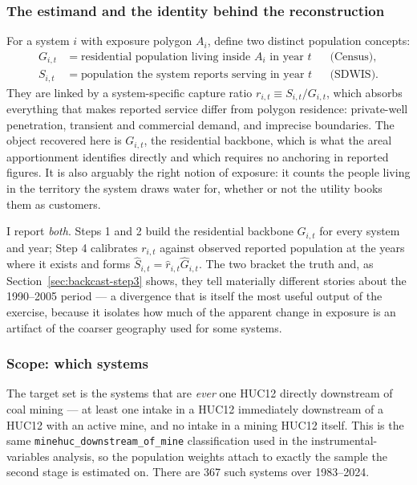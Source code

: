 \subsubsection{The estimand and the identity behind the reconstruction}

For a system $i$ with exposure polygon $A_i$, define two distinct population
concepts:
%
\begin{align}
G_{i,t} &= \text{residential population living inside } A_i \text{ in year } t
  &&\text{(Census)}, \\
S_{i,t} &= \text{population the system reports serving in year } t
  &&\text{(SDWIS)} .
\end{align}
%
They are linked by a system-specific capture ratio $r_{i,t}\equiv S_{i,t}/G_{i,t}$,
which absorbs everything that makes reported service differ from polygon
residence: private-well penetration, transient and commercial demand, and
imprecise boundaries. The object recovered here is $G_{i,t}$, the residential
backbone, which is what the areal apportionment identifies directly and which
requires no anchoring in reported figures. It is also arguably the right notion
of exposure: it counts the people living in the territory the system draws water
for, whether or not the utility books them as customers.

I report \emph{both}. Steps 1 and 2 build the residential backbone $G_{i,t}$ for
every system and year; Step 4 calibrates $r_{i,t}$ against observed reported
population at the years where it exists and forms
$\hat S_{i,t}=\hat r_{i,t}\hat G_{i,t}$. The two bracket the truth and, as
Section~\ref{sec:backcast-step3} shows, they tell materially different stories
about the 1990--2005 period --- a divergence that is itself the most useful
output of the exercise, because it isolates how much of the apparent change in
exposure is an artifact of the coarser geography used for some systems.

\subsubsection{Scope: which systems}

The target set is the systems that are \emph{ever} one HUC12 directly downstream
of coal mining --- at least one intake in a HUC12 immediately downstream of a
HUC12 with an active mine, and no intake in a mining HUC12 itself. This is the
same \texttt{minehuc\_downstream\_of\_mine} classification used in the
instrumental-variables analysis, so the population weights attach to exactly the
sample the second stage is estimated on. There are 367 such systems over
1983--2024.

